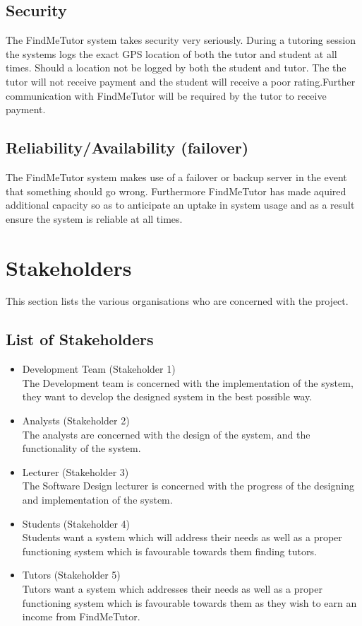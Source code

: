 \documentclass[12pt]{article}
\begin{document}
\subsection{Security}
The FindMeTutor system takes security very seriously. During a tutoring session the systems logs the exact GPS location of both the tutor and student at all times. Should a location not be logged by both the student and tutor. The the tutor will not receive payment and the student will receive a poor rating.Further communication with FindMeTutor will be required by the tutor to receive payment.

\subsection{Reliability/Availability (failover)}
The FindMeTutor system makes use of a failover or backup server in the event that something should go wrong. Furthermore FindMeTutor has made aquired additional capacity so as to anticipate an uptake in system usage and as a result ensure the system is reliable at all times.

\pagebreak

\section{Stakeholders}
This section lists the various organisations who are concerned with the project.
\subsection{List of Stakeholders}
\begin{itemize}
\item Development Team (Stakeholder 1)\\
The Development team is concerned with the implementation of the system, they want to develop the designed system in the best possible way.

\item Analysts (Stakeholder 2)\\
The analysts are concerned with the design of the system, and the functionality of the system.

\item Lecturer (Stakeholder 3)\\
The Software Design lecturer is concerned with the progress of the designing and implementation of the system.

\item Students (Stakeholder 4)\\
Students want a system which will address their needs as well as a proper functioning system which is favourable towards them finding tutors.

\item Tutors (Stakeholder 5)\\
Tutors want a system which addresses their needs as well as a proper functioning system which is favourable towards them as they wish to earn an income from FindMeTutor.
\end{itemize}
\end{document}
